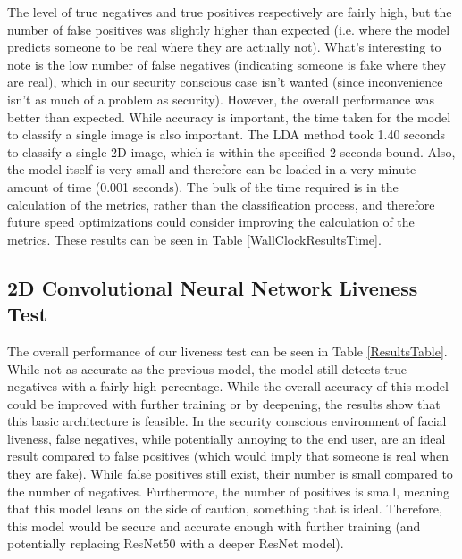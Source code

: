 \documentclass[10pt,a4paper]{article}
\begin{document}
        The level of true negatives and true positives respectively are fairly high, but the number of false positives was slightly higher than expected (i.e. where the model predicts someone to be real where they are actually not).
        What's interesting to note is the low number of false negatives (indicating someone is fake where they are real), which in our security conscious case isn't wanted (since inconvenience isn't as much of a problem as security).
        However, the overall performance was better than expected.
        While accuracy is important, the time taken for the model to classify a single image is also important. The LDA method took 1.40 seconds to classify a single 2D image, which is within the specified 2 seconds bound.
        Also, the model itself is very small and therefore can be loaded in a very minute amount of time (0.001 seconds). The bulk of the time required is in the calculation of the metrics, rather than the classification process,
        and therefore future speed optimizations could consider improving the calculation of the metrics. These results can be seen in Table \ref{WallClockResultsTime}.

    \subsection{2D Convolutional Neural Network Liveness Test}

        The overall performance of our liveness test can be seen in Table \ref{ResultsTable}. While not as accurate as the previous model, the model still detects true negatives with a fairly high percentage.
        While the overall accuracy of this model could be improved with further training or by deepening, the results show that this basic architecture is feasible. In the security conscious environment of facial liveness,
        false negatives, while potentially annoying to the end user, are an ideal result compared to false positives (which would imply that someone is real when they are fake). While false positives still exist, their number is small compared to the number of negatives.
        Furthermore, the number of positives is small, meaning that this model leans on the side of caution, something that is ideal. Therefore, this model would be secure and accurate enough with further training (and potentially replacing ResNet50 with a deeper ResNet model).
\end{document}
